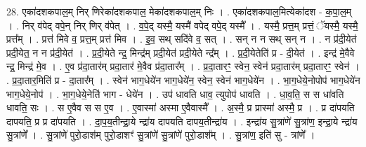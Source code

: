 \documentclass[17pt]{extarticle}
\begin{document}
28. एका॑दशकपाल॒म् निर् णिरेका॑दशकपाल॒ मेका॑दशकपाल॒म् निः । . एका॑दशकपाल॒मित्येका॑दश - क॒पा॒ल॒म् । . निर् व॑पेद् वपे॒न् निर् णिर् व॑पेत् । . व॒पे॒द् यस्मै॒ यस्मै॑ वपेद् वपे॒द् यस्मै᳚ । . यस्मै॒ प्रत्त॒म् प्रत्तं॒ ॅयस्मै॒ यस्मै॒ प्रत्त᳚म् । . प्रत्त॑ मिवे व॒ प्रत्त॒म् प्रत्त॑ मिव । . इ॒व॒ सथ् सदि॑वे व॒ सत् । . सन् न न सथ् सन् न । . न प्र॑दी॒येत॑ प्रदी॒येत॒ न न प्र॑दी॒येत॑ । . प्र॒दी॒येते न्द्र॒ मिन्द्र॑म् प्रदी॒येत॑ प्रदी॒येते न्द्र᳚म् । . प्र॒दी॒येतेति॑ प्र - दी॒येत॑ । . इन्द्र॑ मे॒वैवे न्द्र॒ मिन्द्र॑ मे॒व । . ए॒व प्र॑दा॒तार॑म् प्रदा॒तार॑ मे॒वैव प्र॑दा॒तार᳚म् । . प्र॒दा॒तारꣳ॒॒ स्वेन॒ स्वेन॑ प्रदा॒तार॑म् प्रदा॒तारꣳ॒॒ स्वेन॑ । . प्र॒दा॒तार॒मिति॑ प्र - दा॒तार᳚म् । . स्वेन॑ भाग॒धेये॑न भाग॒धेये॑न॒ स्वेन॒ स्वेन॑ भाग॒धेये॑न । . भा॒ग॒धेये॒नोपोप॑ भाग॒धेये॑न भाग॒धेये॒नोप॑ । . भा॒ग॒धेये॒नेति॑ भाग - धेये॑न । . उप॑ धावति धाव॒ त्युपोप॑ धावति । . धा॒व॒ति॒ स स धा॑वति धावति॒ सः । . स ए॒वैव स स ए॒व । . ए॒वास्मा॑ अस्मा ए॒वैवास्मै᳚ । . अ॒स्मै॒ प्र प्रास्मा॑ अस्मै॒ प्र । . प्र दा॑पयति दापयति॒ प्र प्र दा॑पयति । . दा॒प॒य॒तीन्द्रा॒ये न्द्रा॑य दापयति दापय॒तीन्द्रा॑य । . इन्द्रा॑य सु॒त्रांणे॑ सु॒त्रांण॒ इन्द्रा॒ये न्द्रा॑य सु॒त्रांणे᳚ । . सु॒त्रांणे॑ पुरो॒डाश॑म् पुरो॒डाशꣳ॑ सु॒त्रांणे॑ सु॒त्रांणे॑ पुरो॒डाश᳚म् । . सु॒त्रांण॒ इति॑ सु - त्रांणे᳚ । \newline
\end{document}
